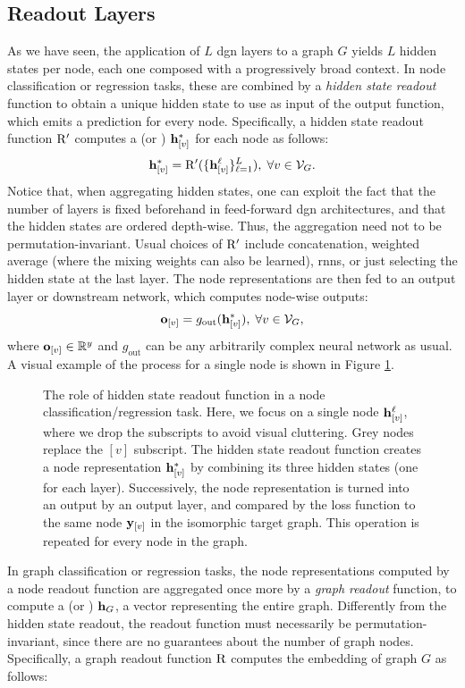 \subsection{Readout Layers}
As we have seen, the application of $L$ \gls{dgn} layers to a graph $G$ yields $L$ hidden states per node, each one composed with a progressively broad context. In node classification or regression tasks, these are combined by a \emph{hidden state readout} function to obtain a unique hidden state to use as input of the output function, which emits a prediction for every node. Specifically, a hidden state readout function $\mathrm{R'}$ computes a  (or ) $\Elem{h}{v}^*$ for each node as follows:
$$\Elem{h}{v}^* = \Fun{R'}(\Set{\Elem{h}{v}^{\ell}}_{\ell=1}^L),\;  \forall v \in \Cal{v}_G. $$
Notice that, when aggregating hidden states, one can exploit the fact that the number of layers is fixed beforehand in feed-forward \gls{dgn} architectures, and that the hidden states are ordered depth-wise. Thus, the aggregation need not to be permutation-invariant. Usual choices of $\mathrm{R'}$ include concatenation, weighted average (where the mixing weights can also be learned), \gls{rnn}s, or just selecting the hidden state at the last layer. The node representations are then fed to an output layer or downstream network, which computes node-wise outputs:
$$\Elem{o}{v} = g_{\mathrm{out}}(\Elem{h}{v}^*),\; \forall v \in \Cal{v}_G,$$
where $\Elem{o}{v} \in \Real^y$ and $g_{\mathrm{out}}$ can be any arbitrarily complex neural network as usual. A visual example of the process for a single node is shown in Figure \ref{fig:node-readout}.
\begin{figure}[h!]
    \centering
    \resizebox{.6\textwidth}{!}{}
    \caption{The role of hidden state readout function in a node classification/regression task. Here, we focus on a single node $\Elem{h}{v}^{\ell}$, where we drop the subscripts to avoid visual cluttering. Grey nodes replace the $[v]$ subscript. The hidden state readout function creates a node representation $\Elem{h}{v}^{*}$ by combining its three hidden states (one for each layer). Successively, the node representation is turned into an output by an output layer, and compared by the loss function to the same node $\Elem{y}{v}$ in the isomorphic target graph. This operation is repeated for every node in the graph.}
    \label{fig:node-readout}
\end{figure}
In graph classification or regression tasks, the node representations computed by a node readout function are aggregated once more by a \emph{graph readout} function, to compute a  (or ) $\Vector{h}_G$, \ie a vector representing the entire graph. Differently from the hidden state readout, the readout function must necessarily be permutation-invariant, since there are no guarantees about the number of graph nodes. Specifically, a graph readout function $\mathrm{R}$ computes the embedding of graph $G$ as follows:

